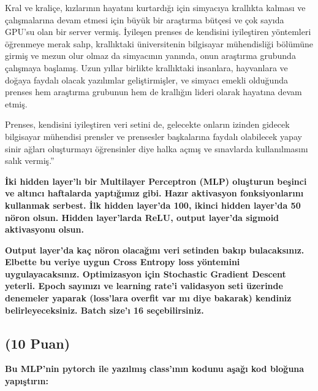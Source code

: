 \documentclass[11pt]{article}
\begin{document}
Kral ve kraliçe, kızlarının hayatını kurtardığı için simyacıya krallıkta kalması ve çalışmalarına devam etmesi için büyük bir araştırma bütçesi ve çok sayıda GPU'su olan bir server vermiş. İyileşen prenses de kendisini iyileştiren yöntemleri öğrenmeye merak salıp, krallıktaki üniversitenin bilgisayar mühendisliği bölümüne girmiş ve mezun olur olmaz da simyacının yanında, onun araştırma grubunda çalışmaya başlamış. Uzun yıllar birlikte krallıktaki insanlara, hayvanlara ve doğaya faydalı olacak yazılımlar geliştirmişler, ve simyacı emekli olduğunda prenses hem araştırma grubunun hem de krallığın lideri olarak hayatına devam etmiş.

Prenses, kendisini iyileştiren veri setini de, gelecekte onların izinden gidecek bilgisayar mühendisi prensler ve prensesler başkalarına faydalı olabilecek yapay sinir ağları oluşturmayı öğrensinler diye halka açmış ve sınavlarda kullanılmasını salık vermiş.''

\textbf{İki hidden layer'lı bir Multilayer Perceptron (MLP) oluşturun beşinci ve altıncı haftalarda yaptığımız gibi. Hazır aktivasyon fonksiyonlarını kullanmak serbest. İlk hidden layer'da 100, ikinci hidden layer'da 50 nöron olsun. Hidden layer'larda ReLU, output layer'da sigmoid aktivasyonu olsun.}

\textbf{Output layer'da kaç nöron olacağını veri setinden bakıp bulacaksınız. Elbette bu veriye uygun Cross Entropy loss yöntemini uygulayacaksınız. Optimizasyon için Stochastic Gradient Descent yeterli. Epoch sayınızı ve learning rate'i validasyon seti üzerinde denemeler yaparak (loss'lara overfit var mı diye bakarak) kendiniz belirleyeceksiniz. Batch size'ı 16 seçebilirsiniz.}

\subsection{(10 Puan)} \textbf{Bu MLP'nin pytorch ile yazılmış class'ının kodunu aşağı kod bloğuna yapıştırın:}
\end{document}
